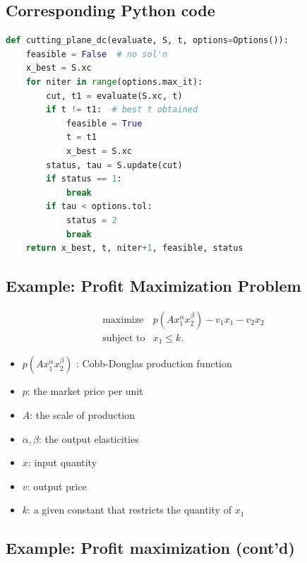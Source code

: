 \documentclass[]{article}
\providecommand{\tightlist}{%
  \setlength{\itemsep}{0pt}\setlength{\parskip}{0pt}}
\begin{document}
\hypertarget{corresponding-python-code}{%
\subsection{Corresponding Python code}\label{corresponding-python-code}}

\begin{lstlisting}[language=Python]
def cutting_plane_dc(evaluate, S, t, options=Options()):
    feasible = False  # no sol'n
    x_best = S.xc
    for niter in range(options.max_it):
        cut, t1 = evaluate(S.xc, t)
        if t != t1:  # best t obtained
            feasible = True
            t = t1
            x_best = S.xc
        status, tau = S.update(cut)
        if status == 1:
            break
        if tau < options.tol:
            status = 2
            break
    return x_best, t, niter+1, feasible, status
\end{lstlisting}

\hypertarget{example-profit-maximization-problem}{%
\subsection{Example: Profit Maximization
Problem}\label{example-profit-maximization-problem}}

\[\begin{array}{ll}
   \text{maximize} & p(A x_1^\alpha x_2^\beta) - v_1 x_1 - v_2 x_2 \\
   \text{subject to}& x_1 \le k.
\end{array}\]

\begin{itemize}
\tightlist
\item
  \(p(A x_1^\alpha x_2^\beta)\) : Cobb-Douglas production function
\item
  \(p\): the market price per unit
\item
  \(A\): the scale of production
\item
  \(\alpha, \beta\): the output elasticities
\item
  \(x\): input quantity
\item
  \(v\): output price
\item
  \(k\): a given constant that restricts the quantity of \(x_1\)
\end{itemize}

\hypertarget{example-profit-maximization-contd}{%
\subsection{Example: Profit maximization
(cont'd)}\label{example-profit-maximization-contd}}
\end{document}
